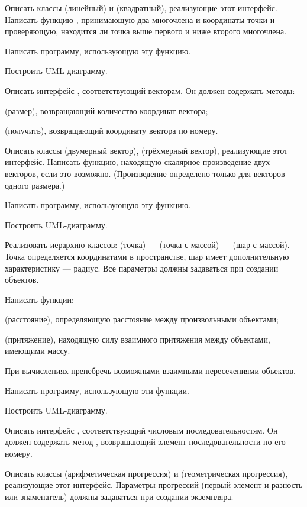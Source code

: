 Описать классы  (линейный) и  (квадратный),
реализующие этот интерфейс. Написать функцию ,
принимающую два многочлена и координаты точки и проверяющую, находится
ли точка выше первого и ниже второго многочлена.

Написать программу, использующую эту функцию.

Построить UML-диаграмму.

\task Описать интерфейс , соответствующий векторам. Он
должен содержать методы:
\begin{itemize*}
\item {} (размер), возвращающий количество координат вектора;
\item {} (получить), возвращающий координату вектора по номеру.
\end{itemize*}

Описать классы  (двумерный вектор), 
(трёхмерный вектор), реализующие этот интерфейс. Написать функцию,
находящую скалярное произведение двух векторов, если это возможно.
(Произведение определено только для векторов одного размера.)

Написать программу, использующую эту функцию.

Построить UML-диаграмму.

\task Реализовать иерархию классов:  (точка) —
 (точка с массой) —  (шар с
массой). Точка определяется координатами в пространстве, шар имеет
дополнительную характеристику — радиус. Все параметры должны
задаваться при создании объектов.

Написать функции:
\begin{itemize*}
\item {} (расстояние), определяющую расстояние между
  произвольными объектами;
\item {} (притяжение), находящую силу взаимного
  притяжения между объектами, имеющими массу.
\end{itemize*}
При вычислениях пренебречь возможными взаимными пересечениями
объектов.

Написать программу, использующую эти функции.

Построить UML-диаграмму.

\task Описать интерфейс , соответствующий числовым
последовательностям. Он должен содержать метод ,
возвращающий элемент последовательности по его номеру.

Описать классы  (арифметическая прогрессия)
и  (геометрическая прогрессия), реализующие
этот интерфейс. Параметры прогрессий (первый элемент и разность или
знаменатель) должны задаваться при создании экземпляра.

